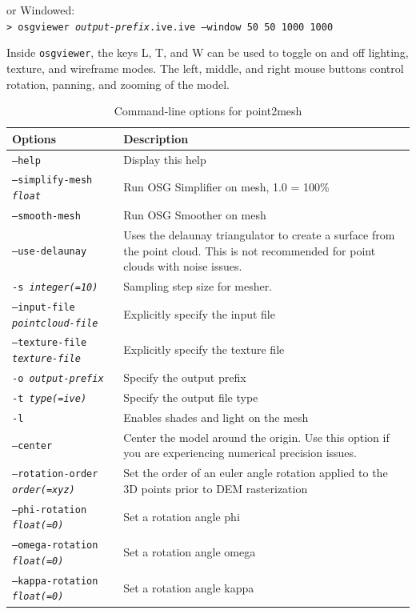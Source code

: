 \hspace*{2em}or Windowed:\\
\hspace*{2em}\texttt{> osgviewer \textit{output-prefix}.ive.ive --window 50 50 1000 1000}

Inside \texttt{osgviewer}, the keys L, T, and W can be used to toggle on
and off lighting, texture, and wireframe modes.  The left, middle, and
right mouse buttons control rotation, panning, and zooming of the
model.

\begin{longtable}{|l|p{10cm}|}
\caption{Command-line options for point2mesh}
\label{tbl:point2mesh}
\endfirsthead
\endhead
\endfoot
\endlastfoot
\hline
Options & Description \\ \hline \hline
\texttt{--help} & Display this help \\ \hline
\texttt{--simplify-mesh \textit{float}} & Run OSG Simplifier on mesh, 1.0 = 100\% \\ \hline
\texttt{--smooth-mesh} & Run OSG Smoother on mesh \\ \hline
\texttt{--use-delaunay} & Uses the delaunay triangulator to create a surface from the point cloud. This is not recommended for point clouds with noise issues. \\ \hline
\texttt{-s \textit{integer(=10)}} & Sampling step size for mesher. \\ \hline
\texttt{--input-file \textit{pointcloud-file}} & Explicitly specify the input file \\ \hline
\texttt{--texture-file \textit{texture-file}} & Explicitly specify the texture file \\ \hline
\texttt{-o \textit{output-prefix}} & Specify the output prefix \\ \hline
\texttt{-t \textit{type(=ive)}} & Specify the output file type \\ \hline
\texttt{-l} & Enables shades and light on the mesh \\ \hline
\texttt{--center} & Center the model around the origin. Use this option if you are experiencing numerical precision issues. \\ \hline
\texttt{--rotation-order \textit{order(=xyz)}} & Set the order of an euler angle rotation applied to the 3D points prior to DEM rasterization \\ \hline
\texttt{--phi-rotation \textit{float(=0)}} & Set a rotation angle phi \\ \hline
\texttt{--omega-rotation \textit{float(=0)}} & Set a rotation angle omega \\ \hline
\texttt{--kappa-rotation \textit{float(=0)}} & Set a rotation angle kappa \\ \hline
\end{longtable}

